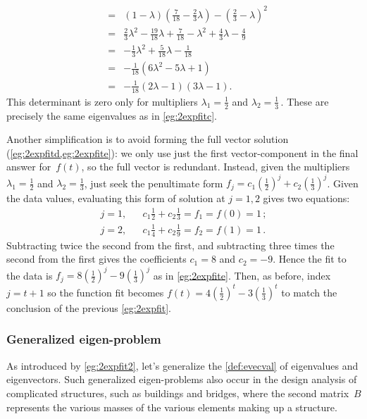 \begin{reduce}
\begin{example}
\begin{solution}
\begin{eqnarray*}
&=&(1-\lambda)(\tfrac7{18}-\tfrac23\lambda)-(\tfrac23-\lambda)^2
\\&=&\tfrac23\lambda^2-\tfrac{19}{18}\lambda+\tfrac7{18}
-\lambda^2+\tfrac43\lambda-\tfrac49
\\&=&-\tfrac13\lambda^2+\tfrac5{18}\lambda-\tfrac1{18}
\\&=&-\tfrac1{18}(6\lambda^2-5\lambda+1)
\\&=&-\tfrac1{18}(2\lambda-1)(3\lambda-1).
\end{eqnarray*}
This determinant is zero only for multipliers \(\lambda_1=\tfrac12\) and \(\lambda_2=\tfrac13\)\,. 
These are precisely the same eigenvalues as in \autoref{eg:2expfitc}.

Another simplification is to avoid forming the full vector solution (\autoref{eg:2expfitd,eg:2expfite}):
we only use just the first vector-component in the final answer for~\(f(t)\), so the full vector is redundant.
Instead, given the multipliers \(\lambda_1=\tfrac12\) and \(\lambda_2=\tfrac13\), just seek the penultimate form \(f_j=c_1(\tfrac12)^j+c_2(\tfrac13)^j\).
Given the data values, evaluating this form of solution at \(j=1,2\) gives two equations:
\begin{eqnarray*}
j=1,&&c_1\tfrac12+c_2\tfrac13=f_1=f(0)=1\,;
\\
j=2,&&c_1\tfrac14+c_2\tfrac19=f_2=f(1)=1\,.
\end{eqnarray*}
Subtracting twice the second from the first, and subtracting three times the second from the first gives the coefficients \(c_1=8\) and \(c_2=-9\).
Hence the fit to the data is \(f_j=8(\frac12)^j -9(\frac13)^j\) as in \autoref{eg:2expfite}.
Then, as before, index \(j=t+1\) so the function fit becomes \(f(t)=4(\frac12)^{t} -3(\frac13)^{t}\) to match the conclusion of the previous \autoref{eg:2expfit}.
\end{solution}
\end{example}




\subsubsection{Generalized eigen-problem}


As introduced by \autoref{eg:2expfit2}, let's generalize the \autoref{def:evecval} of eigenvalues and eigenvectors.
Such generalized eigen-problems also occur in the design analysis of complicated structures, such as buildings and bridges, where the second matrix~\(B\) represents the various masses of the various elements making up a structure.


\end{reduce}
